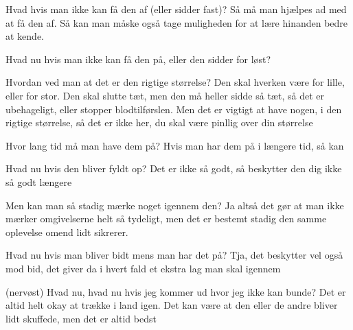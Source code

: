 \documentclass[a4paper,11pt]{article}
\begin{document}
\begin{sketch}
Hvad hvis man ikke kan få den af (eller sidder fast)?
Så må man hjælpes ad med at få den af. Så kan man måske også tage muligheden for at lære hinanden bedre at kende.

Hvad nu hvis man ikke kan få den på, eller den sidder for løst?

Hvordan ved man at det er den rigtige størrelse?
Den skal hverken være for lille, eller for stor. Den skal slutte tæt, men den må heller sidde så tæt, så det er ubehageligt, eller stopper blodtilførslen. Men det er vigtigt at have nogen, i den rigtige størrelse, så det er ikke her, du skal være pinllig over din størrelse

Hvor lang tid må man have dem på?
Hvis man har dem på i længere tid, så kan

Hvad nu hvis den bliver fyldt op?
Det er ikke så godt, så beskytter den dig ikke så godt længere

Men kan man så stadig mærke noget igennem den?
Ja altså det gør at man ikke mærker omgivelserne helt så tydeligt, men det er bestemt stadig den samme oplevelse omend lidt sikrerer. 

Hvad nu hvis man bliver bidt mens man har det på?
Tja, det beskytter vel også mod bid, det giver da i hvert fald et ekstra lag man skal igennem

(nervøst) Hvad nu, hvad nu hvis jeg kommer ud hvor jeg ikke kan bunde?
Det er altid helt okay at trække i land igen. Det kan være at den eller de andre bliver lidt skuffede, men det er altid bedst 

\end{sketch}
\end{document}

